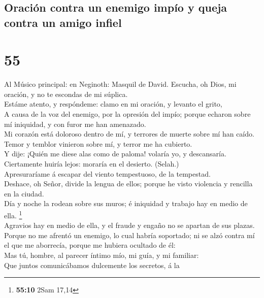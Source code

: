 \hypertarget{oraciuxf3n-contra-un-enemigo-impuxedo-y-queja-contra-un-amigo-infiel}{%
\subsection{Oración contra un enemigo impío y queja contra un amigo
infiel}\label{oraciuxf3n-contra-un-enemigo-impuxedo-y-queja-contra-un-amigo-infiel}}

\hypertarget{section-54}{%
\section{55}\label{section-54}}

 Al Músico principal: en Neginoth: Masquil de David.
Escucha, oh Dios, mi oración, y no te escondas de mi súplica.\\
 Estáme atento, y respóndeme: clamo en mi oración, y
levanto el grito,\\
 A causa de la voz del enemigo, por la opresión del impío;
porque echaron sobre mí iniquidad, y con furor me han amenazado.\\
 Mi corazón está doloroso dentro de mí, y terrores de
muerte sobre mí han caído.\\
 Temor y temblor vinieron sobre mí, y terror me ha
cubierto.\\
 Y dije: ¡Quién me diese alas como de paloma! volaría yo,
y descansaría.\\
 Ciertamente huiría lejos: moraría en el desierto.
(Selah.)\\
 Apresuraríame á escapar del viento tempestuoso, de la
tempestad.\\
 Deshace, oh Señor, divide la lengua de ellos; porque he
visto violencia y rencilla en la ciudad.\\
 Día y noche la rodean sobre sus muros; é iniquidad y
trabajo hay en medio de ella. \footnote{\textbf{55:10} 2Sam 17,14}\\
 Agravios hay en medio de ella, y el fraude y engaño no
se apartan de sus plazas.\\
 Porque no me afrentó un enemigo, lo cual habría
soportado; ni se alzó contra mí el que me aborrecía, porque me hubiera
ocultado de él:\\
 Mas tú, hombre, al parecer íntimo mío, mi guía, y mi
familiar:\\
 Que juntos comunicábamos dulcemente los secretos, á la
